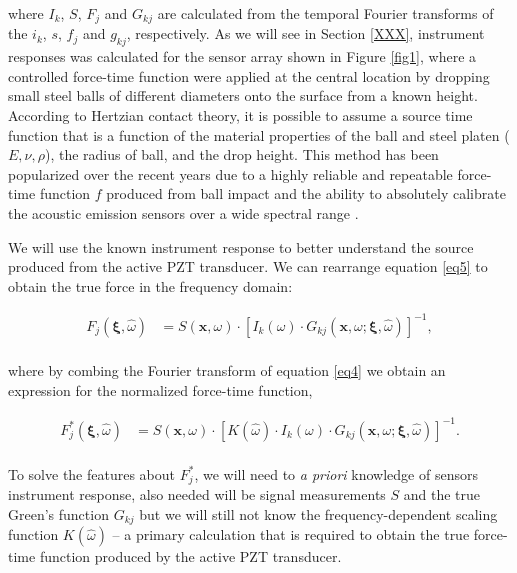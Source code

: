 \documentclass[preprint,3p, 11pt,authoryear]{elsarticle}
\begin{document}
\noindent where $I_{k}$, $S$, $F_{j}$ and $G_{kj}$ are calculated from the temporal Fourier transforms of the $i_{k}$, $s$, $f_{j}$ and $g_{kj}$, respectively.  As we will see in Section \ref{XXX}, instrument responses was calculated for the sensor array shown in Figure \ref{fig1}, where a controlled force-time function were applied at the central location by dropping small steel balls of different diameters onto the surface from a known height. According to Hertzian contact theory, it is possible to assume a source time function that is a function of the material properties of the ball and steel platen ($E, \nu, \rho$), the radius of ball, and the drop height. This method has been popularized over the recent years due to a highly reliable and repeatable force-time function $f$ produced from ball impact and the ability to absolutely calibrate the acoustic emission sensors over a wide spectral range \citep{McLaskey2010, McLaskey2012, McLaskey2015}.

We will use the known instrument response to better understand the source produced from the active PZT transducer.  We can rearrange equation \eqref{eq5} to obtain the true force in the frequency domain:

\begin{equation}
    \label{eq6}
\begin{split}
F_{j}\left( \mathbf{\xi}, \hat{\omega} \right) & = 
        S\left( \mathbf{x}, \omega \right) \cdot \left[ I_{k}\left(\omega \right) \cdot G_{kj}\left( \mathbf{x}, \omega; \mathbf{\xi}, \hat{\omega} \right)\right]^{-1}, \\
\end{split}
\end{equation}

\noindent where by combing the Fourier transform of equation \eqref{eq4} we obtain an expression for the normalized force-time function,

\begin{equation}
    \label{eq7}
\begin{split}
F^{*}_{j}\left( \mathbf{\xi}, \hat{\omega} \right) & = 
        S\left( \mathbf{x}, \omega \right) \cdot \left[ K\left(\hat{\omega}\right) \cdot I_{k}\left(\omega \right) \cdot G_{kj}\left( \mathbf{x}, \omega; \mathbf{\xi}, \hat{\omega} \right)\right]^{-1}.\\     
\end{split}
\end{equation}

\noindent To solve the features about $F^{*}_{j}$, we will need to \textit{a priori} knowledge of sensors instrument response, also needed will be signal measurements $S$ and the true Green's function $G_{kj}$ but we will still not know the frequency-dependent scaling function $K(\hat{\omega})$ -- a primary calculation that is required to obtain the true force-time function produced by the active PZT transducer.
\end{document}
